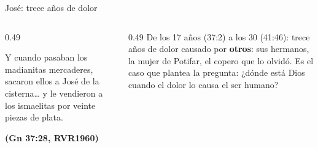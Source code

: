 \documentclass[hyperref={bookmarks=false},aspectratio=169]{beamer}
\newcommand{\fuente}[1]{\par\hfill{\upshape\bfseries\footnotesize\textcolor{azul}{#1}}}
\newcommand{\destacar}[1]{\textbf{\textcolor{azul}{#1}}}
\begin{document}
\begin{frame}{José: trece años de dolor}
\centering
{}\par\medskip
\begin{columns}[t,onlytextwidth]
\begin{column}{0.49\textwidth}
\begin{cita}Y cuando pasaban los madianitas mercaderes, sacaron ellos a José de la cisterna\ldots{} y le vendieron a los ismaelitas por veinte piezas de plata.\fuente{(Gn 37:28, RVR1960)}\end{cita}
\end{column}
\begin{column}{0.49\textwidth}\small
De los 17 años (37:2) a los 30 (41:46): trece años de dolor causado por \destacar{otros}: sus hermanos, la mujer de Potifar, el copero que lo olvidó. Es el caso que plantea la pregunta: ¿dónde está Dios cuando el dolor lo causa el ser humano?
\end{column}
\end{columns}
\end{frame}
\end{document}
